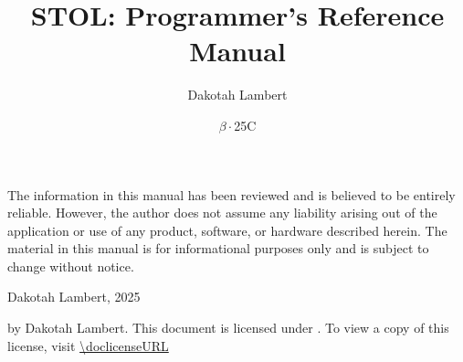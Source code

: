 \documentclass[12pt,english]{book}
\title{STOL: Programmer's Reference Manual}
\author{Dakotah Lambert}
\date{\(\beta\cdot{}\)25C}
\begin{document}
\frontmatter
\maketitle
\leavevmode\thispagestyle{empty}
\vfill
\noindent
The information in this manual has been reviewed
and is believed to be entirely reliable.
However, the author does not assume any liability
arising out of the application or use of any product,
software, or hardware described herein.
The material in this manual is for informational purposes only
and is subject to change without notice.

\vspace{\baselineskip}\noindent
\parbox[c]{1in}{\doclicenseImage[imagewidth=1in]} Dakotah Lambert, 2025

\vspace{\baselineskip}\noindent
{} by Dakotah Lambert.
This document is licensed under
\doclicenseLongName.
To view a copy of this license,
visit \url{\doclicenseURL}
\tableofcontents
\let\ocleardoublepage\cleardoublepage
\let\cleardoublepage\clearpage
\listoffigures
\listoftables
\let\cleardoublepage\ocleardoublepage

\clearpage
\end{document}
